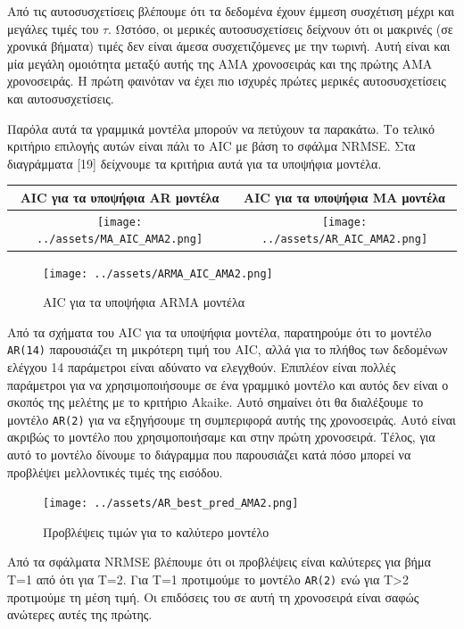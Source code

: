 \documentclass[11pt,]{article}
\begin{document}
Από τις αυτοσυσχετίσεις βλέπουμε ότι τα δεδομένα έχουν έμμεση συσχέτιση
μέχρι και μεγάλες τιμές του \(\tau\). Ωστόσο, οι μερικές αυτοσυσχετίσεις
δείχνουν ότι οι μακρινές (σε χρονικά βήματα) τιμές δεν είναι άμεσα
συσχετιζόμενες με την τωρινή. Αυτή είναι και μία μεγάλη ομοιότητα μεταξύ
αυτής της AMA χρονοσειράς και της πρώτης AMA χρονοσειράς. Η πρώτη
φαινόταν να έχει πιο ισχυρές πρώτες μερικές αυτοσυσχετίσεις και
αυτοσυσχετίσεις.

Παρόλα αυτά τα γραμμικά μοντέλα μπορούν να πετύχουν τα παρακάτω. Το
τελικό κριτήριο επιλογής αυτών είναι πάλι το AIC με βάση το σφάλμα
NRMSE. Στα διαγράμματα {[}19{]} δείχνουμε τα κριτήρια αυτά για τα
υποψήφια μοντέλα.

\begin{longtable}[]{@{}cc@{}}
\toprule
AIC για τα υποψήφια AR μοντέλα & AIC για τα υποψήφια MA
μοντέλα\tabularnewline
\midrule
\endhead
\texttt{[image: ../assets/MA\_AIC\_AMA2.png]}
&
\texttt{[image: ../assets/AR\_AIC\_AMA2.png]}\tabularnewline
\bottomrule
\end{longtable}

\begin{figure}
\centering
\texttt{[image: ../assets/ARMA\_AIC\_AMA2.png]}
\caption{AIC για τα υποψήφια ARMA μοντέλα}
\end{figure}

Από τα σχήματα του AIC για τα υποψήφια μοντέλα, παρατηρούμε ότι το
μοντέλο \texttt{AR(14)} παρουσιάζει τη μικρότερη τιμή του AIC, αλλά για
το πλήθος των δεδομένων ελέγχου 14 παράμετροι είναι αδύνατο να
ελεγχθούν. Επιπλέον είναι πολλές παράμετροι για να χρησιμοποιήσουμε σε
ένα γραμμικό μοντέλο και αυτός δεν είναι ο σκοπός της μελέτης με το
κριτήριο Akaike. Αυτό σημαίνει ότι θα διαλέξουμε το μοντέλο
\texttt{AR(2)} για να εξηγήσουμε τη συμπεριφορά αυτής της χρονοσειράς.
Αυτό είναι ακριβώς το μοντέλο που χρησιμοποιήσαμε και στην πρώτη
χρονοσειρά. Τέλος, για αυτό το μοντέλο δίνουμε το διάγραμμα που
παρουσιάζει κατά πόσο μπορεί να προβλέψει μελλοντικές τιμές της εισόδου.

\begin{figure}
\centering
\texttt{[image: ../assets/AR\_best\_pred\_AMA2.png]}
\caption{Προβλέψεις τιμών για το καλύτερο μοντέλο}
\end{figure}

Από τα σφάλματα NRMSE βλέπουμε ότι οι προβλέψεις είναι καλύτερες για
βήμα T=1 από ότι για T=2. Για T=1 προτιμούμε το μοντέλο \texttt{AR(2)}
ενώ για T\textgreater{}2 προτιμούμε τη μέση τιμή. Οι επιδόσεις του σε
αυτή τη χρονοσειρά είναι σαφώς ανώτερες αυτές της πρώτης.
\end{document}
